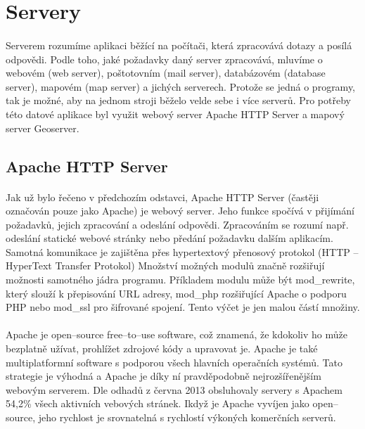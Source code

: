 \documentclass[11pt,a4paper,titlepage,oneside]{book}
\begin{document}
	\section{Servery}
		\paragraph{} Serverem rozumíme aplikaci běžící na počítači, která zpracovává dotazy a posílá odpovědi. Podle toho, jaké požadavky daný server zpracovává, mluvíme o webovém (web server), poštotovním (mail server), databázovém (database server), mapovém (map server) a jichých serverech. Protože se jedná o programy, tak je možné, aby na jednom stroji běželo velde sebe i více serverů. Pro potřeby této datové aplikace byl využit webový server Apache HTTP Server\cite{apache} a mapový server Geoserver.
		\subsection{Apache HTTP Server}
			\paragraph{} Jak už bylo řečeno v předchozím odstavci, Apache HTTP Server (častěji označován pouze jako Apache) je webový server. Jeho funkce spočívá v přijímání požadavků, jejich zpracování a odeslání odpovědi. Zpracováním se rozumí např. odeslání statické webové stránky nebo předání požadavku dalším aplikacím. Samotná komunikace je zajištěna přes hypertextový přenosový protokol (HTTP -- HyperText Transfer Protokol) Množství možných modulů značně rozšiřují možnosti samotného jádra programu. Příkladem modulu může být mod\_rewrite, který slouží k přepisování URL adresy, mod\_php rozšiřující Apache o podporu PHP nebo mod\_ssl pro šifrované spojení. Tento výčet je jen malou částí množiny.
			\paragraph{} Apache je open--source free--to--use software, což znamená, že kdokoliv ho může bezplatně užívat, prohlížet zdrojové kódy a upravovat je. Apache je také multiplatformní software s podporou všech hlavních operačních systémů. Tato strategie je výhodná a Apache je díky ní pravděpodobně nejrozšířenějším webovým serverem. Dle odhadů z června 2013 obsluhovaly servery s Apachem  54,2\% všech aktivních vebových stránek\cite{wiki-Apache}. Ikdyž je Apache vyvíjen jako open--source, jeho rychlost je srovnatelná s rychlostí výkoných komerčních serverů. 
\end{document}
